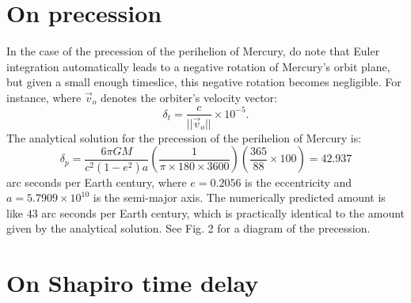 \documentclass[12pt]{article}
\begin{document}
\section{On precession}


In the case of the precession of the perihelion of Mercury, do note that Euler integration automatically leads to a negative rotation of Mercury's orbit plane, but given a small enough timeslice, this negative rotation becomes negligible.
For instance, where $\vec{v}_{o}$ denotes the orbiter's velocity vector:
\begin{equation}
\label{dt_other}
\delta_{t} = \frac{c}{\lvert\lvert \vec{v}_{o} \rvert \rvert} \times 10^{-5}.
\end{equation}
The analytical solution for the precession of the perihelion of Mercury is:
\begin{equation}
\label{delta_p}
\delta_{p} = \frac{6 \pi G M}{c^2 (1 - e^2) a} \left( \frac{1}{ \pi \times 180 \times 3600} \right) \left( \frac{365}{88} \times 100 \right) = 42.937
\end{equation}
arc seconds per Earth century, where $e = 0.2056$ is the eccentricity and $a = 5.7909 \times 10^{10}$ is the semi-major axis.
The numerically predicted amount is like $43$ arc seconds per Earth century, which is practically identical to the amount given by the analytical solution.
See Fig. 2 for a diagram of the precession.




\section{On Shapiro time delay}
\end{document}
